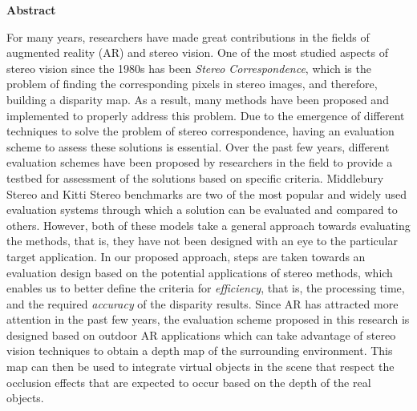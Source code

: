 \begin{center}
\textbf{\large Abstract}
\end{center}
For many years, researchers have made great contributions in the fields of augmented reality (AR) and stereo vision. 
One of the most studied aspects of stereo vision since the 1980s has been \textit{Stereo Correspondence}, which is the problem of 
finding the corresponding pixels in stereo images, and therefore, building a disparity map.
As a result, many methods have been proposed and implemented to properly address this problem. 
Due to the emergence of different techniques to solve the problem of stereo correspondence, having an evaluation scheme to assess 
these solutions is essential. Over the past few years, different evaluation schemes have been proposed 
by researchers in the field to provide a testbed for assessment of the solutions based on specific criteria.
Middlebury Stereo and Kitti Stereo benchmarks
are two of the most popular and widely used evaluation systems through which a solution can be evaluated and compared 
to others. 
However, both of these models take a general approach towards evaluating the methods, that is, they 
have not been designed with an eye to the particular target application.
In our proposed approach, steps are taken towards an evaluation design based on the potential applications of stereo methods, 
which enables us to better define the criteria for \textit{efficiency}, that is, the processing time, 
and the required \textit{accuracy} of the disparity results.
Since AR has attracted more attention in the past few years, 
the evaluation scheme proposed in this research is designed based on outdoor AR applications which can take advantage of
stereo vision techniques to obtain a depth map of the surrounding environment. This map can then be used to
integrate virtual objects in the scene that respect the occlusion effects that are expected to occur based on the depth of the real objects. 

